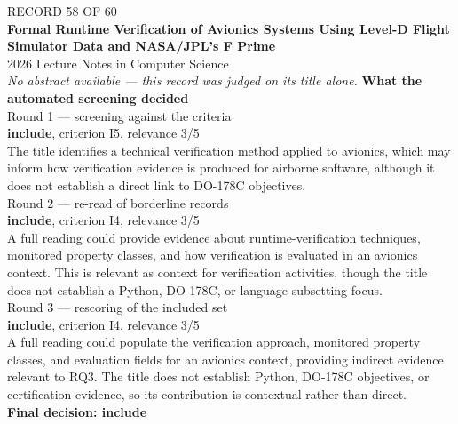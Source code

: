 \documentclass[11pt,a4paper]{article}
\begin{document}
\clearpage
{\color{soft}\footnotesize RECORD 58 OF 60}\\[1mm]
{\large\bfseries Formal Runtime Verification of Avionics Systems Using Level-D Flight Simulator Data and NASA/JPL's F Prime}\\[1.5mm]
{\color{soft}\small 2026 \textperiodcentered{} Lecture Notes in Computer Science}\\[2mm]
{\small\itshape\color{soft}No abstract available --- this record was judged on its title alone.}
\vspace{3mm}
\vspace{2.5mm}
{\small\textbf{What the automated screening decided}}\\[2mm]
{\footnotesize\color{soft}Round 1 --- screening against the criteria}\\[0.5mm]
{\small\textbf{include}, criterion I5, relevance 3/5}\\[0.5mm]
{\small The title identifies a technical verification method applied to avionics, which may inform how verification evidence is produced for airborne software, although it does not establish a direct link to DO-178C objectives.}\\[2.5mm]
{\footnotesize\color{soft}Round 2 --- re-read of borderline records}\\[0.5mm]
{\small\textbf{include}, criterion I4, relevance 3/5}\\[0.5mm]
{\small A full reading could provide evidence about runtime-verification techniques, monitored property classes, and how verification is evaluated in an avionics context. This is relevant as context for verification activities, though the title does not establish a Python, DO-178C, or language-subsetting focus.}\\[2.5mm]
{\footnotesize\color{soft}Round 3 --- rescoring of the included set}\\[0.5mm]
{\small\textbf{include}, criterion I4, relevance 3/5}\\[0.5mm]
{\small A full reading could populate the verification approach, monitored property classes, and evaluation fields for an avionics context, providing indirect evidence relevant to RQ3. The title does not establish Python, DO-178C objectives, or certification evidence, so its contribution is contextual rather than direct.}\\[2.5mm]
{\small\textbf{Final decision: include}}
\end{document}
